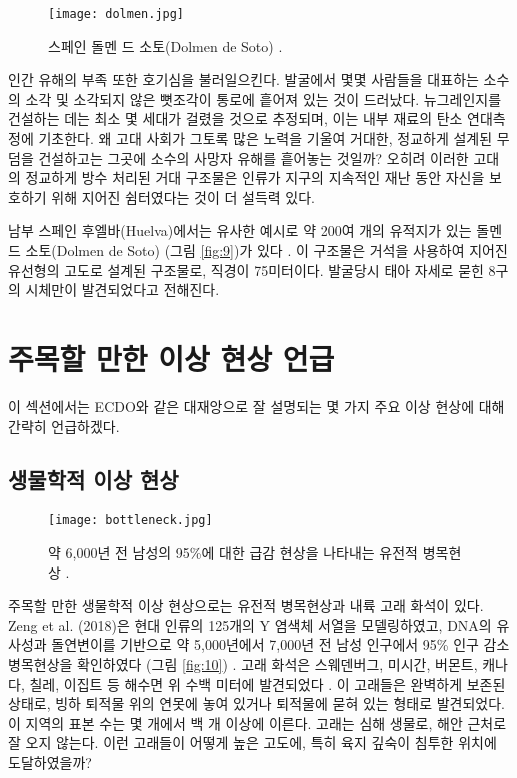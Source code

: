 \documentclass[10pt,twocolumn,letterpaper]{article}
\begin{document}
\begin{figure}[b]
\begin{center}
   \texttt{[image: dolmen.jpg]}
\end{center}
   \caption{스페인 돌멘 드 소토(Dolmen de Soto) \cite{53}.}
\label{fig:9}
\label{fig:onecol}
\end{figure}

인간 유해의 부족 또한 호기심을 불러일으킨다. 발굴에서 몇몇 사람들을 대표하는 소수의 소각 및 소각되지 않은 뼛조각이 통로에 흩어져 있는 것이 드러났다. 뉴그레인지를 건설하는 데는 최소 몇 세대가 걸렸을 것으로 추정되며, 이는 내부 재료의 탄소 연대측정에 기초한다. 왜 고대 사회가 그토록 많은 노력을 기울여 거대한, 정교하게 설계된 무덤을 건설하고는 그곳에 소수의 사망자 유해를 흩어놓는 것일까? 오히려 이러한 고대의 정교하게 방수 처리된 거대 구조물은 인류가 지구의 지속적인 재난 동안 자신을 보호하기 위해 지어진 쉼터였다는 것이 더 설득력 있다.

남부 스페인 후엘바(Huelva)에서는 유사한 예시로 약 200여 개의 유적지가 있는 돌멘 드 소토(Dolmen de Soto) (그림 \ref{fig:9})가 있다 \cite{72,32}. 이 구조물은 거석을 사용하여 지어진 유선형의 고도로 설계된 구조물로, 직경이 75미터이다. 발굴당시 태아 자세로 묻힌 8구의 시체만이 발견되었다고 전해진다.

\section{주목할 만한 이상 현상 언급}

이 섹션에서는 ECDO와 같은 대재앙으로 잘 설명되는 몇 가지 주요 이상 현상에 대해 간략히 언급하겠다.

\subsection{생물학적 이상 현상}

\begin{figure}[t]
\begin{center}
   \texttt{[image: bottleneck.jpg]}
\end{center}
   \caption{약 6,000년 전 남성의 95\%에 대한 급감 현상을 나타내는 유전적 병목현상 \cite{62}.}
\label{fig:10}
\label{fig:onecol}
\end{figure}

주목할 만한 생물학적 이상 현상으로는 유전적 병목현상과 내륙 고래 화석이 있다. Zeng et al. (2018)은 현대 인류의 125개의 Y 염색체 서열을 모델링하였고, DNA의 유사성과 돌연변이를 기반으로 약 5,000년에서 7,000년 전 남성 인구에서 95\% 인구 감소 병목현상을 확인하였다 (그림 \ref{fig:10}) \cite{62}. 고래 화석은 스웨덴버그, 미시간, 버몬트, 캐나다, 칠레, 이집트 등 해수면 위 수백 미터에 발견되었다 \cite{63,64,65,66}. 이 고래들은 완벽하게 보존된 상태로, 빙하 퇴적물 위의 연못에 놓여 있거나 퇴적물에 묻혀 있는 형태로 발견되었다. 이 지역의 표본 수는 몇 개에서 백 개 이상에 이른다. 고래는 심해 생물로, 해안 근처로 잘 오지 않는다. 이런 고래들이 어떻게 높은 고도에, 특히 육지 깊숙이 침투한 위치에 도달하였을까?
\end{document}
